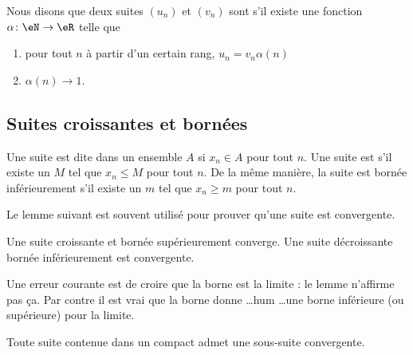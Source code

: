 \begin{definition}      \label{DEFooEWRTooKgShmT}
    Nous disons que deux suites \( (u_n)\) et \( (v_n)\) sont  s'il existe une fonction \( \alpha\colon \eN\to \eR\) telle que
    \begin{enumerate}
        \item
            pour tout \( n\) à partir d'un certain rang, \( u_n=v_n\alpha(n)\)
        \item
            \( \alpha(n)\to 1\).
    \end{enumerate}
\end{definition}

\subsection{Suites croissantes et bornées}

Une suite est dite  dans un ensemble $A$ si $x_n\in A$ pour tout $n$. Une suite est  s'il existe un $M$ tel que $x_n\leq M$ pour tout $n$. De la même manière, la suite est bornée inférieurement s'il existe un $m$ tel que $x_n\geq m$ pour tout $n$.

Le lemme suivant est souvent utilisé pour prouver qu'une suite est convergente.
\begin{lemma}		\label{LemSuiteCrBorncv}
	Une suite croissante et bornée supérieurement converge. Une suite décroissante bornée inférieurement est convergente.
\end{lemma}

Une erreur courante est de croire que la borne est la limite : le lemme n'affirme pas ça. Par contre il est vrai que la borne donne \ldots hum \ldots une borne inférieure (ou supérieure) pour la limite.

\begin{theorem}     \label{THOooRDYOooJHLfGq}
    Toute suite contenue dans un compact admet une sous-suite convergente.
\end{theorem}

